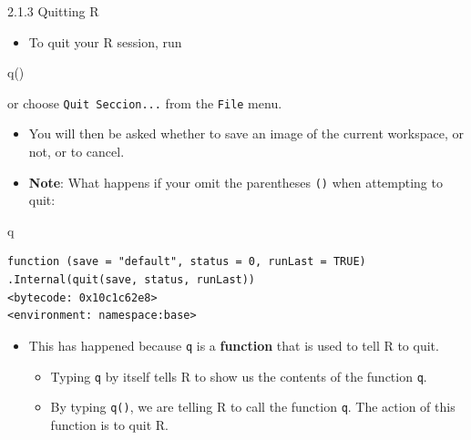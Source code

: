 \documentclass[
  9pt,
  a4paper,
  ignorenonframetext,
  notheorems]{beamer}
\newenvironment{Shaded}{\begin{snugshade}}{\end{snugshade}}
\newcommand{\FunctionTok}[1]{\textcolor[rgb]{0.28,0.35,0.67}{#1}}
\newcommand{\NormalTok}[1]{\textcolor[rgb]{0.00,0.23,0.31}{#1}}
\providecommand{\tightlist}{%
  \setlength{\itemsep}{0pt}\setlength{\parskip}{0pt}}\usepackage{longtable,booktabs,array}
\begin{document}
\begin{frame}[fragile]{2.1.3 Quitting R}
\protect\hypertarget{quitting-r}{}
\begin{itemize}
\tightlist
\item
  To quit your R session, run
\end{itemize}

\begin{Shaded}
\begin{Highlighting}[]
\FunctionTok{q}\NormalTok{()}
\end{Highlighting}
\end{Shaded}

or choose \texttt{Quit\ Seccion...} from the \texttt{File} menu.

\begin{itemize}
\tightlist
\item
  You will then be asked whether to save an image of the current
  workspace, or not, or to cancel.
\end{itemize}

\begin{itemize}
\tightlist
\item
  \textbf{Note}: What happens if your omit the parentheses \texttt{()}
  when attempting to quit:
\end{itemize}

\begin{Shaded}
\begin{Highlighting}[]
\NormalTok{q}
\end{Highlighting}
\end{Shaded}

\begin{verbatim}
function (save = "default", status = 0, runLast = TRUE) 
.Internal(quit(save, status, runLast))
<bytecode: 0x10c1c62e8>
<environment: namespace:base>
\end{verbatim}

\begin{itemize}
\tightlist
\item
  This has happened because \texttt{q} is a \textbf{function} that is
  used to tell R to quit.

  \begin{itemize}
  \tightlist
  \item
    Typing \texttt{q} by itself tells R to show us the contents of the
    function \texttt{q}.
  \item
    By typing \texttt{q()}, we are telling R to call the function
    \texttt{q}. The action of this function is to quit R.
  \end{itemize}
\end{itemize}
\end{frame}
\end{document}
